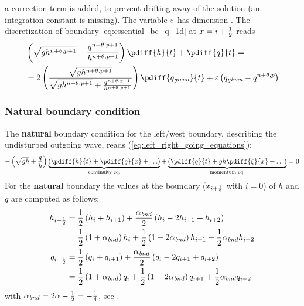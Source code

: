a correction term is added, to prevent drifting away of the solution (an integration constant is missing).
The variable $\varepsilon$ has dimension \bunit{\per\second}.
The discretization of  boundary \autoref{eq:essential_bc_q_1d} at $x=i+\frac{1}{2}$ reads
\begin{align}
    &\left(\sqrt{gh^{n+\theta,p+1}} - \frac{q^{n+\theta,p+1}}{h^{n+\theta,p+1}} \right) \pdiff{h}{t} + \pdiff{q}{t} =
    \nonumber \\*
    & = 2 \left(  \frac{\sqrt{gh^{n+\theta,p+1}}}{\sqrt{gh^{n+\theta,p+1}} + \frac{q^{n+\theta,p+1}}{h^{n+\theta,p+1}}} \right) \pdiff{q_{\textit{given}}}{t} + \eps \left( q_{\textit{given}} - q^{n+\theta,p}   \right)
\end{align}

\subsubsection{Natural boundary condition}

The \textbf{natural} boundary condition for the left/west boundary, describing the undisturbed outgoing wave, reads (\autoref{eq:left_right_going_equations}):
\begin{align}
- \left(\sqrt{gh} + \frac{q}{h}\right) \underbrace{ \left(\pdiff{h}{t} + \pdiff{q}{x} + \ldots \right) }_{\text{continuity eq.}} + \underbrace{\left(\pdiff{q}{t} + g h \pdiff{\zeta}{x}+\ldots\right)}_{\text{momentum eq.}} = 0
\label{eq:natural_bc_1d}
\end{align}
For the \textbf{natural} boundary the values at the boundary ($x_{i+\frac{1}{2}}$ with $i=0$) of $h$ and $q$ are computed as follows:
%
\begin{align}
    h_{i+\frac{1}{2}} & = \frac{1}{2} \left( h_{i} +  h_{i+1} \right) +
    \frac{\alpha_{\mathit bnd}}{2} \left( h_{i}
    - 2 h_{i+1} + h_{i+2} \right)
    \nonumber \\*
    & = \frac{1}{2} \left( 1 + \alpha_{\mathit bnd} \right) h_{i} +
    \frac{1}{2} \left( 1 - 2\alpha_{\mathit bnd} \right) h_{i+1} +
    \frac{1}{2} \alpha_{\mathit bnd} h_{i+2}\label{eq:h_at_left_boundary}
    \\
    q_{i+\frac{1}{2}} & =  \frac{1}{2} \left( q_{i} + q_{i+1}\right)
    + \frac{\alpha_{\mathit bnd}}{2} \left( q_{i}
    - 2 q_{i+1} + q_{i+2} \right)
    \nonumber \\*
    & = \frac{1}{2} \left( 1 + \alpha_{\mathit bnd} \right) q_{i} +
    \frac{1}{2} \left( 1 - 2\alpha_{\mathit bnd} \right) q_{i+1} +
    \frac{1}{2} \alpha_{\mathit bnd} q_{i+2}\label{eq:q_at_left_boundary}
\end{align}
with $\alpha_{\mathit bnd} = 2 \alpha - \frac{1}{2} = -\frac{1}{4}$, see \citet{transpeq-analysisdiscretizationinsidedomain_boundaries.mw}.
